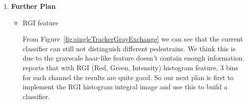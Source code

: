 \documentclass[a4paper]{article}
\begin{document}
\begin{enumerate}
\begin{itemize}
\begin{itemize}
\end{itemize}

\end{itemize}

\item \textbf{Further Plan}

\begin{itemize}

\item RGI feature

From Figure~\ref{fig:singleTrackerGrayExchange} we can see that the current classifier can still not distinguish different pedestrains. We think this is due to the grayscale haar-like feature doesn't contain enough information. \cite{eth_biwi_00633} reports that with RGI (Red, Green, Intensity) histogram feature, 3 bins for each channel the results are quite good. So our next plan is first to implement the RGI histogram integral image and use this to build a classifier.


\end{itemize}
\end{enumerate}
\end{document}
